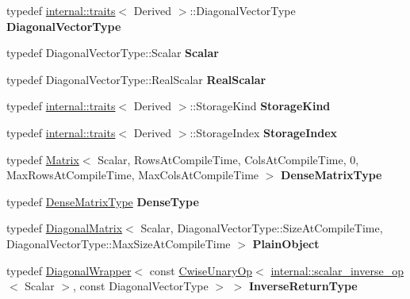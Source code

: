 \begin{DoxyCompactItemize}
typedef \hyperlink{struct_eigen_1_1internal_1_1traits}{internal\+::traits}$<$ Derived $>$\+::Diagonal\+Vector\+Type {\bfseries Diagonal\+Vector\+Type}
\item 
\mbox{\label{class_eigen_1_1_diagonal_base_a1e21c32c49ea8d2053c03dab3a2e698b}} 
typedef Diagonal\+Vector\+Type\+::\+Scalar {\bfseries Scalar}
\item 
\mbox{\label{class_eigen_1_1_diagonal_base_a8d046c4e1744039ba3bd8bcfdbc47fab}} 
typedef Diagonal\+Vector\+Type\+::\+Real\+Scalar {\bfseries Real\+Scalar}
\item 
\mbox{\label{class_eigen_1_1_diagonal_base_a093f1f20c042b2624e42645e407a2d6a}} 
typedef \hyperlink{struct_eigen_1_1internal_1_1traits}{internal\+::traits}$<$ Derived $>$\+::Storage\+Kind {\bfseries Storage\+Kind}
\item 
\mbox{\label{class_eigen_1_1_diagonal_base_a0850b562c94689d6f1b24805749fa127}} 
typedef \hyperlink{struct_eigen_1_1internal_1_1traits}{internal\+::traits}$<$ Derived $>$\+::Storage\+Index {\bfseries Storage\+Index}
\item 
\mbox{\label{class_eigen_1_1_diagonal_base_a5b03ccd914288064b6db84176fde6643}} 
typedef \hyperlink{group___core___module_class_eigen_1_1_matrix}{Matrix}$<$ Scalar, Rows\+At\+Compile\+Time, Cols\+At\+Compile\+Time, 0, Max\+Rows\+At\+Compile\+Time, Max\+Cols\+At\+Compile\+Time $>$ {\bfseries Dense\+Matrix\+Type}
\item 
\mbox{\label{class_eigen_1_1_diagonal_base_ab57e4c5bcb838b2fbfb7bcc6c828e3b1}} 
typedef \hyperlink{group___core___module_class_eigen_1_1_matrix}{Dense\+Matrix\+Type} {\bfseries Dense\+Type}
\item 
\mbox{\label{class_eigen_1_1_diagonal_base_a12790179b6a63c133521233851728448}} 
typedef \hyperlink{group___core___module_class_eigen_1_1_diagonal_matrix}{Diagonal\+Matrix}$<$ Scalar, Diagonal\+Vector\+Type\+::\+Size\+At\+Compile\+Time, Diagonal\+Vector\+Type\+::\+Max\+Size\+At\+Compile\+Time $>$ {\bfseries Plain\+Object}
\item 
\mbox{\label{class_eigen_1_1_diagonal_base_abf3d0ad516e702c213e11f28bae2eb14}} 
typedef \hyperlink{group___core___module_class_eigen_1_1_diagonal_wrapper}{Diagonal\+Wrapper}$<$ const \hyperlink{group___core___module_class_eigen_1_1_cwise_unary_op}{Cwise\+Unary\+Op}$<$ \hyperlink{struct_eigen_1_1internal_1_1scalar__inverse__op}{internal\+::scalar\+\_\+inverse\+\_\+op}$<$ Scalar $>$, const Diagonal\+Vector\+Type $>$ $>$ {\bfseries Inverse\+Return\+Type}
\end{DoxyCompactItemize}
